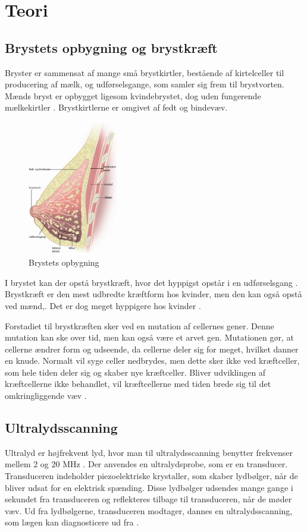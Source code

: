\chapter{Teori}\label{Teori}

\section{Brystets opbygning og brystkræft}
Bryster er sammensat af mange små brystkirtler, bestående af kirtelceller til producering af mælk, og udførselsgange, som samler sig frem til brystvorten. Mænds bryst er opbygget ligesom kvindebrystet, dog uden fungerende mælkekirtler \cite{Mand}. Brystkirtlerne er omgivet af fedt og bindevæv\citep{Bryst}.

\begin{figure}[H]
    \centering
    \includegraphics[width=0.35\textwidth]{figurer/r/bryst}
    \caption{Brystets opbygning \citep{Bryst}}
    \label{Brystet}
\end{figure}

I brystet kan der opstå brystkræft, hvor det hyppigst opstår i en udførselsgang \citep{Bryst}. Brystkræft er den mest udbredte kræftform hos kvinder, men den kan også opstå ved mænd,. Det er dog meget hyppigere hos kvinder \cite{Mand}.

Forstadiet til brystkræften sker ved en mutation af cellernes gener. Denne mutation kan ske over tid, men kan også være et arvet gen. Mutationen gør, at cellerne ændrer form og udseende, da cellerne deler sig for meget, hvilket danner en knude. Normalt vil syge celler nedbrydes, men dette sker ikke ved kræftceller, som hele tiden deler sig og skaber nye kræftceller. Bliver udviklingen af kræftcellerne ikke behandlet, vil kræftcellerne med tiden brede sig til det omkringliggende væv \cite{Udvikling}. 

\section{Ultralydsscanning}
Ultralyd er højfrekvent lyd, hvor man til ultralydsscanning benytter frekvenser mellem 2 og 20 MHz \cite{HUSK}. Der anvendes en ultralydsprobe, som er en transducer. Transduceren indeholder piezoelektriske krystaller, som skaber lydbølger, når de bliver udsat for en elektrisk spænding. Disse lydbølger udsendes mange gange i sekundet fra transduceren og reflekteres tilbage til transduceren, når de møder væv. Ud fra lydbølgerne, transduceren modtager, dannes en ultralydsscanning, som lægen kan diagnosticere ud fra \cite{Ultralydsscanning}.

